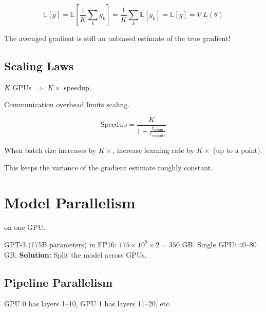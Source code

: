 \begin{equation}
    \mathbb{E}[\bar{g}] = \mathbb{E}\left[\frac{1}{K}\sum_k g_k\right] = \frac{1}{K}\sum_k \mathbb{E}[g_k] = \mathbb{E}[g] = \nabla L(\theta)
\end{equation}

The averaged gradient is still an unbiased estimate of the true gradient!



\subsection{Scaling Laws}

 $K$ GPUs $\Rightarrow$ $K\times$ speedup.

 Communication overhead limits scaling.

\begin{equation}
    \text{Speedup} = \frac{K}{1 + \frac{t_{\text{comm}}}{t_{\text{compute}}}}
\end{equation}

 When batch size increases by $K\times$, increase learning rate by $K\times$ (up to a point).

This keeps the variance of the gradient estimate roughly constant.




\newpage
\section{Model Parallelism}

 on one GPU.

GPT-3 (175B parameters) in FP16: $175 \times 10^9 \times 2 = 350$ GB.
Single GPU: 40--80 GB.
\textbf{Solution:} Split the model across GPUs.

\subsection{Pipeline Parallelism}

 GPU 0 has layers 1--10, GPU 1 has layers 11--20, etc.

